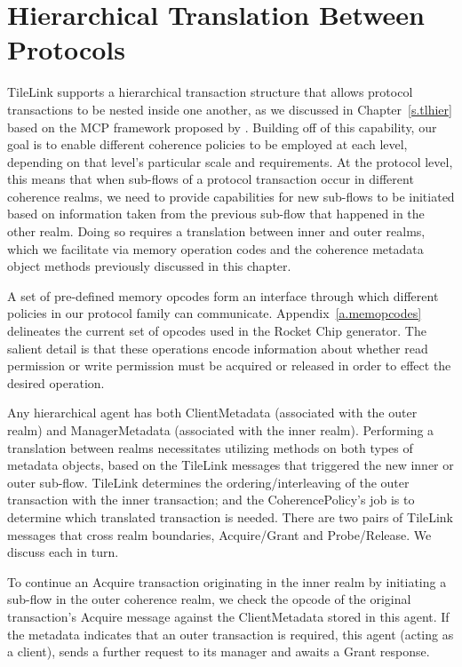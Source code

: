 \section{Hierarchical Translation Between Protocols}

TileLink supports a hierarchical transaction structure that allows protocol transactions
to be nested inside one another, as we discussed in Chapter~\ref{s.tlhier}
based on the MCP framework proposed by \cite{beu2011manager}.
Building off of this capability, our goal is to enable different coherence policies to be employed at each level,
depending on that level's particular scale and requirements.
At the protocol level, this means that when sub-flows of a protocol transaction
occur in different coherence realms, we need to provide capabilities for
new sub-flows to be initiated based on information taken from the previous sub-flow
that happened in the other realm.
Doing so requires a translation between inner and outer realms,
which we facilitate via memory operation codes and the
coherence metadata object methods previously discussed in this chapter.

A set of pre-defined memory opcodes
form an interface through which different policies in our protocol family can communicate.
Appendix~\ref{a.memopcodes} delineates the current set of opcodes used in the Rocket Chip generator.
The salient detail is that these operations encode information about whether read permission or write permission
must be acquired or released in order to effect the desired operation.

Any hierarchical agent has both ClientMetadata (associated with the outer realm)
and ManagerMetadata (associated with the inner realm).
Performing a translation between realms necessitates utilizing methods on both types of metadata objects,
based on the TileLink messages that triggered the new inner or outer sub-flow.
TileLink determines the ordering/interleaving of the outer transaction with the inner transaction;
and the CoherencePolicy's job is to determine which translated transaction is needed.
There are two pairs of TileLink messages that cross realm boundaries,
Acquire/Grant and Probe/Release.
We discuss each in turn.

To continue an Acquire transaction originating in the inner realm
by initiating a sub-flow in the outer coherence realm, we check the opcode
of the original transaction's Acquire message against the ClientMetadata stored in this agent.
If the metadata indicates that an outer transaction is required, this agent (acting as a client),
sends a further request to its manager and awaits a Grant response.

